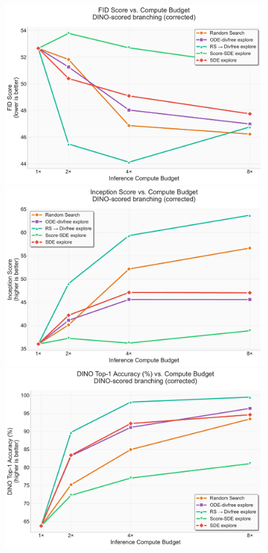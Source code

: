 \documentclass{article}
\begin{document}
\begin{figure}[H]
  \centering
  \begin{minipage}{0.32\textwidth}
    \centering
    \includegraphics[width=\textwidth]{figures/scaling_dino_fid.pdf}
  \end{minipage}
  \hfill
  \begin{minipage}{0.32\textwidth}
    \centering
    \includegraphics[width=\textwidth]{figures/scaling_dino_is.pdf}
  \end{minipage}
  \hfill
  \begin{minipage}{0.32\textwidth}
    \centering
    \includegraphics[width=\textwidth]{figures/scaling_dino_top1.pdf}

\end{minipage}
\end{figure}
\end{document}
